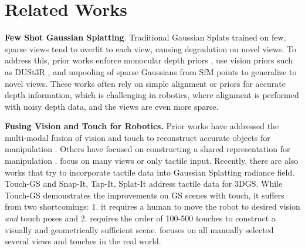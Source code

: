 \section{Related Works}
\label{sec:related-works}
\textbf{Few Shot Gaussian Splatting}. Traditional Gaussian Splats trained on few, sparse views tend to overfit to each view, causing degradation on novel views. To address this, prior works  enforce monocular depth priors \cite{chung2024depthregularized, paliwal2024coherentgssparsenovelview}, use vision priors such as DUSt3R \cite{dust3r2023}, and unpooling of sparse Gaussians from SfM points \cite{zhu2023fsgs} to generalize to novel views. These works often rely on simple alignment or priors for accurate depth information, which is challenging in robotics, where alignment is performed with noisy depth data, and the views are even more sparse.

\textbf{Fusing Vision and Touch for Robotics.} Prior works have addressed the multi-modal fusion of vision and touch to reconstruct accurate objects for manipulation \cite{smith2021active, suresh2023neural}. Others have focused on constructing a shared representation for manipulation \cite{yang2024binding, fu2024touch}.  \cite{watkins2019multi, smith20203d} focus on many views or only tactile input. Recently, there are also works that try to incorporate tactile data into Gaussian Splatting radiance field. Touch-GS \cite{swann2024touch} and Snap-It, Tap-It, Splat-It \cite{comi2024snap} address tactile data for \gls*{3DGS}. While Touch-GS demonstrates the improvements on GS scenes with touch, it suffers from two shortcomings: 1. it requires a human to move the robot to desired vision \textit{and} touch poses and 2. requires the order of 100-500 touches to construct a visually and geometrically sufficient scene. \cite{comi2024snap} focuses on all manually selected several views and touches in the real world.


